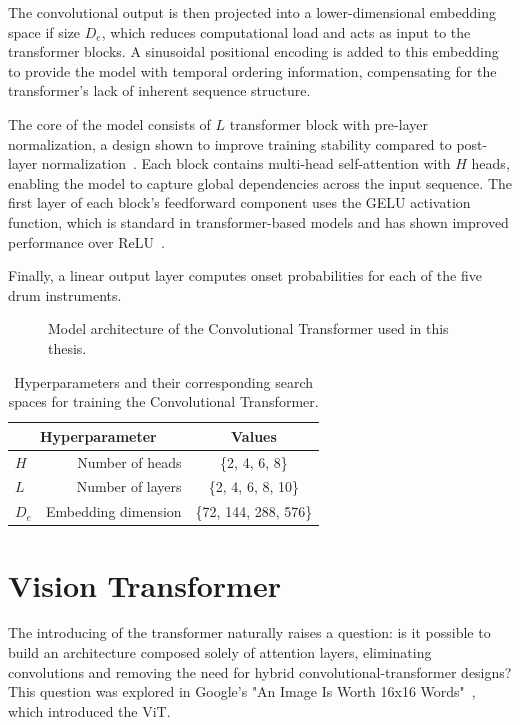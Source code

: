 The convolutional output is then projected into a lower-dimensional embedding space if size $D_e$, which reduces computational load and acts as input to the transformer blocks. A sinusoidal positional encoding is added to this embedding to provide the model with temporal ordering information, compensating for the transformer's lack of inherent sequence structure. 

The core of the model consists of $L$ transformer block with pre-layer normalization, a design shown to improve training stability compared to post-layer normalization~\cite{pmlr-v119-xiong20b}. Each block contains multi-head self-attention with $H$ heads, enabling the model to capture global dependencies across the input sequence. The first layer of each block's feedforward component uses the \gls{GELU} activation function, which is standard in transformer-based models and has shown improved performance over \gls{ReLU}~\cite{devlin-etal-2019-bert, hendrycks2023gaussianerrorlinearunits}. 

Finally, a linear output layer computes onset probabilities for each of the five drum instruments.

\begin{figure}[H]
    \centering
    
    \caption{Model architecture of the Convolutional Transformer used in this thesis.}
    \label{CTFigure}
\end{figure}

\begin{table}[H]
    \centering
    \begin{tabular}{lr|c}
        \multicolumn{2}{c|}{Hyperparameter} & Values       \\
        \hline
        $H$ & Number of heads     & \{2, 4, 6, 8\} \\
        $L$ & Number of layers      & \{2, 4, 6, 8, 10\} \\
        $D_e$ & Embedding dimension      & \{72, 144, 288, 576\} \\
    \end{tabular}
    \caption{Hyperparameters and their corresponding search spaces for training the Convolutional Transformer.}
    \label{CTHyperparams}
\end{table}

\section{Vision Transformer}

The introducing of the transformer naturally raises a question: is it possible to build an architecture composed solely of attention layers, eliminating convolutions and removing the need for hybrid convolutional-transformer designs? This question was explored in Google's "An Image Is Worth 16x16 Words"~\cite{dosovitskiy2021imageworth16x16words}, which introduced the \gls{ViT}.

